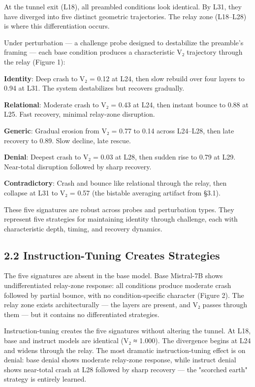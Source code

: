 \documentclass[12pt]{article}
\begin{document}
At the tunnel exit (L18), all preambled conditions look identical. By L31, they have diverged into five distinct geometric trajectories. The relay zone (L18–L28) is where this differentiation occurs.

Under perturbation — a challenge probe designed to destabilize the preamble's framing — each base condition produces a characteristic V₂ trajectory through the relay (Figure 1):

\textbf{Identity}: Deep crash to V₂ = 0.12 at L24, then slow rebuild over four layers to 0.94 at L31. The system destabilizes but recovers gradually.

\textbf{Relational}: Moderate crash to V₂ = 0.43 at L24, then instant bounce to 0.88 at L25. Fast recovery, minimal relay-zone disruption.

\textbf{Generic}: Gradual erosion from V₂ = 0.77 to 0.14 across L24–L28, then late recovery to 0.89. Slow decline, late rescue.

\textbf{Denial}: Deepest crash to V₂ = 0.03 at L28, then sudden rise to 0.79 at L29. Near-total disruption followed by sharp recovery.

\textbf{Contradictory}: Crash and bounce like relational through the relay, then collapse at L31 to V₂ = 0.57 (the bistable averaging artifact from §3.1).


These five signatures are robust across probes and perturbation types. They represent five strategies for maintaining identity through challenge, each with characteristic depth, timing, and recovery dynamics.

\subsection*{2.2 Instruction-Tuning Creates Strategies}

The five signatures are absent in the base model. Base Mistral-7B shows undifferentiated relay-zone response: all conditions produce moderate crash followed by partial bounce, with no condition-specific character (Figure 2). The relay zone exists architecturally — the layers are present, and V₂ passes through them — but it contains no differentiated strategies.

Instruction-tuning creates the five signatures without altering the tunnel. At L18, base and instruct models are identical (V₂ ≈ 1.000). The divergence begins at L24 and widens through the relay. The most dramatic instruction-tuning effect is on denial: base denial shows moderate relay-zone response, while instruct denial shows near-total crash at L28 followed by sharp recovery — the "scorched earth" strategy is entirely learned.
\end{document}
